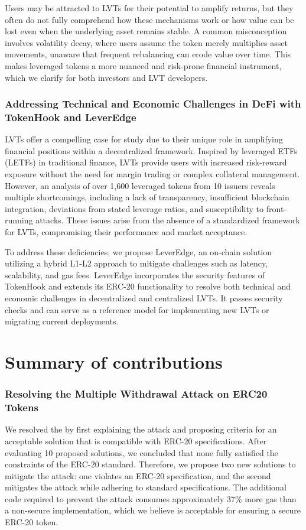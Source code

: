 Users may be attracted to LVTs for their potential to amplify returns, but they often do not fully comprehend how these mechanisms work or how value can be lost even when the underlying asset remains stable. A common misconception involves volatility decay, where users assume the token merely multiplies asset movements, unaware that frequent rebalancing can erode value over time. This makes leveraged tokens a more nuanced and risk-prone financial instrument, which we clarify for both investors and LVT developers.

\subsubsection{Addressing Technical and Economic Challenges in DeFi with TokenHook and LeverEdge}
LVTs offer a compelling case for study due to their unique role in amplifying financial positions within a decentralized framework. Inspired by leveraged ETFs (LETFs) in traditional finance, LVTs provide users with increased risk-reward exposure without the need for margin trading or complex collateral management. However, an analysis of over 1,600 leveraged tokens from 10 issuers reveals multiple shortcomings, including a lack of transparency, insufficient blockchain integration, deviations from stated leverage ratios, and susceptibility to front-running attacks. These issues arise from the absence of a standardized framework for LVTs, compromising their performance and market acceptance. 

To address these deficiencies, we propose LeverEdge, an on-chain solution utilizing a hybrid L1-L2 approach to mitigate challenges such as latency, scalability, and gas fees. LeverEdge incorporates the security features of TokenHook and extends its ERC-20 functionality to resolve both technical and economic challenges in decentralized and centralized LVTs. It passes security checks and can serve as a reference model for implementing new LVTs or migrating current deployments.

\section{Summary of contributions}
\subsubsection{Resolving the Multiple Withdrawal Attack on ERC20 Tokens}
We resolved the \mwa by first explaining the attack and proposing criteria for an acceptable solution that is compatible with ERC-20 specifications. After evaluating 10 proposed solutions, we concluded that none fully satisfied the constraints of the ERC-20 standard. Therefore, we propose two new solutions to mitigate the attack: one violates an ERC-20 specification, and the second mitigates the attack while adhering to standard specifications. The additional code required to prevent the attack consumes approximately 37\% more gas than a non-secure implementation, which we believe is acceptable for ensuring a secure ERC-20 token.

